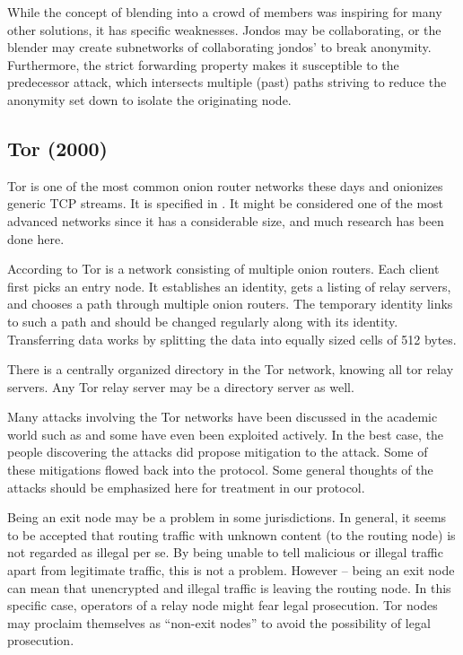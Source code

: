 While the concept of blending into a crowd of members was inspiring for many other solutions, it has specific weaknesses. Jondos may be collaborating, or the blender may create subnetworks of collaborating jondos' to break anonymity. Furthermore, the strict forwarding property makes it susceptible to the predecessor attack\cite{wright2004predecessor}, which intersects multiple (past) paths striving to reduce the anonymity set down to isolate the originating node.

\subsection{Tor (2000)}\label{sec:tor}
Tor is one of the most common onion router networks these days and onionizes generic TCP streams. It is specified in \cite{tor-spec}. It might be considered one of the most advanced networks since it has a considerable size, and much research has been done here.

According to \cite{onion-routing:pet2000} Tor is a network consisting of multiple onion routers. Each client first picks an entry node. It establishes an identity, gets a listing of relay servers, and chooses a path through multiple onion routers. The temporary identity links to such a path and should be changed regularly along with its identity. Transferring data works by splitting the data into equally sized cells of 512 bytes.

There is a centrally organized directory in the Tor network, knowing all tor relay servers. Any Tor relay server may be a directory server as well. 

Many attacks involving the Tor networks have been discussed in the academic world such as \cite{hs-attack06,esorics13-cellflood,bauer:wpes2007,esorics12-torscan,oakland2013-trawling,danner-et-al:tissec12,congestion-longpaths} and some have even been exploited actively. In the best case, the people discovering the attacks did propose mitigation to the attack. Some of these mitigations flowed back into the protocol. Some general thoughts of the attacks should be emphasized here for treatment in our protocol.

Being an exit node may be a problem in some jurisdictions. In general, it seems to be accepted that routing traffic with unknown content (to the routing node) is not regarded as illegal per se. By being unable to tell malicious or illegal traffic apart from legitimate traffic, this is not a problem. However -- being an exit node can mean that unencrypted and illegal traffic is leaving the routing node. In this specific case, operators of a relay node might fear legal prosecution. Tor nodes may proclaim themselves as  ``non-exit nodes''  to avoid the possibility of legal prosecution.

